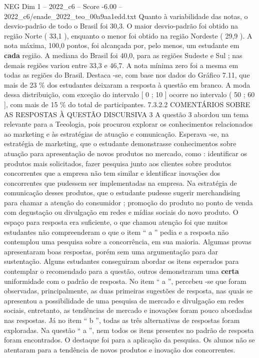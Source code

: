 \begin{textsample}{NEG Dim 1 – 2022\_c6 – Score -6.00 – 2022\_c6/enade\_2022\_teo\_00a9aa1edd.txt}
Quanto à variabilidade das notas, o desvio-padrão de todo o Brasil foi 30,3.
O maior desvio-padrão foi obtido na região Norte ( 33,1 ), enquanto o menor foi obtido na região Nordeste ( 29,9 ).
A nota máxima, 100,0 pontos, foi alcançada por, pelo menos, um estudante em \textbf{cada} região.
A mediana do Brasil foi 40,0, para as regiões Sudeste e Sul ; nas demais regiões variou entre 33,3 e 46,7.
A nota mínima zero foi a mesma em todas as regiões do Brasil.
Destaca -se, com base nos dados do Gráfico 7.11, que mais de 23 \% dos estudantes deixaram a resposta à questão em branco.
A moda dessa distribuição, com exceção do intervalo [ 0 ; 10 ] ocorre no intervalo ( 50 ; 60 ], com mais de 15 \% do total de participantes. 7.3.2.2 COMENTÁRIOS SOBRE AS RESPOSTAS À QUESTÃO DISCURSIVA 3 A questão 3 abordou um tema relevante para a Teeologia, pois procurou explorar os conhecimentos relacionados ao marketing e às estratégias de atuação e comunicação.
Esperava -se, na estratégia de marketing, que o estudante demonstrasse conhecimentos sobre atuação para apresentação de novos produtos no mercado, como : identificar os produtos mais solicitados, fazer pesquisa junto aos clientes sobre produtos concorrentes que a empresa não tem similar e identificar inovações dos concorrentes que pudessem ser implementadas na empresa.
Na estratégia de comunicação desses produtos, que o estudante pudesse sugerir merchandising para chamar a atenção do consumidor ; promoção do produto no ponto de venda com degustação ou divulgação em redes e mídias sociais do novo produto.
O espaço para resposta era suficiente, o que chamou atenção foi que muitos estudantes não compreenderam o que o item “ a ” pedia e a resposta não contemplou uma pesquisa sobre a concorrência, em sua maioria.
Algumas provas apresentaram boas respostas, porém sem uma argumentação para dar sustentação.
Alguns estudantes conseguiram abordar os itens esperados para contemplar o recomendado para a questão, outros demonstraram uma \textbf{certa} uniformidade com o padrão de resposta.
No item “ a ”, percebeu -se que foram observadas, principalmente, as duas primeiras sugestões de resposta, nas quais se apresentou a possibilidade de uma pesquisa de mercado e divulgação em redes sociais, entretanto, as tendências de mercado e inovações foram pouco abordadas nas respostas.
Já no item “ b ”, todas as três alternativas de respostas foram exploradas.
Na questão “ a ”, nem todos os itens presentes no padrão de resposta foram encontrados.
O destaque foi para a aplicação da pesquisa.
Os alunos não se atentaram para a tendência de novos produtos e inovação dos concorrentes.

\end{textsample}
